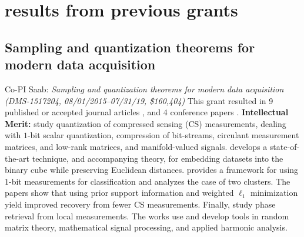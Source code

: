 
\section{results from previous grants}
\subsection{Sampling and quantization theorems for modern data acquisition}
{Co-PI Saab: \em Sampling and quantization theorems for modern data acquisition (DMS-1517204, 08/01/2015--07/31/19,
\$160,404)} 
This grant resulted in 9 published or accepted journal articles \cite{KSW16, MS16, NSW16, SWY16, NSW17, LS2018, IPSV2018, HS2018, FKS17}, and 4 conference papers \cite{NSW17_conf, FKS17_conf, IPSV17_conf, ILNS19}.  {\bf Intellectual Merit:}  \cite{KSW16, SWY16, FKS17, LS2018, ILNS19} study quantization of compressed sensing (CS) measurements,  dealing with  $1$-bit scalar quantization, compression of  bit-streams,  circulant measurement matrices, and low-rank matrices, and manifold-valued signals. \cite{HS2018} develops a state-of-the-art technique, and accompanying theory, for embedding datasets into the binary cube while preserving Euclidean distances.  \cite{NSW17} provides a framework for using $1$-bit  measurements for classification  and analyzes the case of two clusters. The papers \cite{MS16, NSW16} show that using prior support information and weighted $\ell_1$ minimization yield improved recovery  from fewer CS measurements. Finally, \cite{IPSV2018, IPSV17_conf} study phase retrieval from local measurements. The works use and develop tools in random matrix theory, mathematical signal processing, and applied harmonic analysis.  
